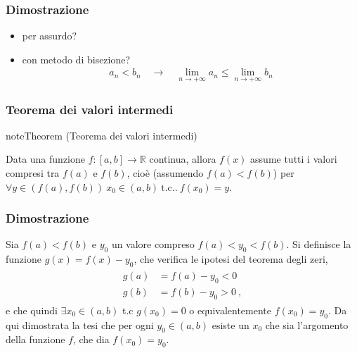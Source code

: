 \documentclass[letterpaper,10pt,italian]{jupyterBook}
\begin{document}
\subsubsection*{Dimostrazione}

\sphinxAtStartPar
{}
\begin{itemize}
\item {} 
\sphinxAtStartPar
per assurdo?

\item {} 
\sphinxAtStartPar
con metodo di bisezione? 
\begin{equation*}
\begin{split}a_n < b_n \quad \rightarrow \quad \lim_{n \rightarrow +\infty} a_n \le \lim_{n \rightarrow +\infty} b_n\end{split}
\end{equation*}
\end{itemize}


\subsubsection{Teorema dei valori intermedi}
\label{\detokenize{ch/infinitesimal_calculus/analysis:teorema-dei-valori-intermedi}}\label{\detokenize{ch/infinitesimal_calculus/analysis:infinitesimal-calculus-continuous-fun-thms-intermediate}}\label{None:thm:infinitesimal-calculus:continuous-fun:thms:intermediate}
\begin{sphinxadmonition}{note}{Theorem  (Teorema dei valori intermedi)}



\sphinxAtStartPar
Data una funzione \(f: [a,b] \rightarrow \mathbb{R}\) continua, allora \(f(x)\) assume tutti i valori compresi tra \(f(a)\) e \(f(b)\), cioè (assumendo \(f(a) < f(b)\)) per \(\forall y \in (f(a), f(b)) \ x_0 \in (a,b) \ \text{t.c..} \ f(x_0) = y\).
\end{sphinxadmonition}
\subsubsection*{Dimostrazione}

\sphinxAtStartPar
Sia \(f(a) < f(b)\) e \(y_0\) un valore compreso \(f(a) < y_0 < f(b)\). Si definisce la funzione \(g(x) = f(x) - y_0\), che verifica le ipotesi del teorema degli zeri,
\begin{equation*}
\begin{split}\begin{aligned}
  g(a) & = f(a) - y_0 < 0 \\
  g(b) & = f(b) - y_0 > 0 \ ,
\end{aligned}\end{split}
\end{equation*}
\sphinxAtStartPar
e che quindi \(\exists x_0 \in (a,b)\) t.c \(g(x_0) = 0\) o equivalentemente \(f(x_0) = y_0\). Da qui dimostrata la tesi che per ogni \(y_0 \in (a,b)\) esiste un \(x_0\) che sia l’argomento della funzione \(f\), che dia \(f(x_0) = y_0\).
\end{document}
